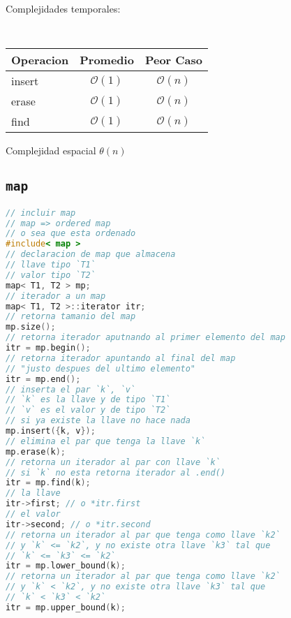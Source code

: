 \documentclass{article}
\newcommand{\bigO}{\mathcal{O}}
\begin{document}
\begin{multicols}{2}
Complejidades temporales:
\begin{table}[H]
  \tt \scriptsize
  \begin{center}
    \begin{tabular}[c]{l|c|c}
      \hline
      Operacion & Promedio & Peor Caso\\
      \hline
      insert & $\bigO(1)$ & $\bigO(n)$ \\
      \hline
      erase & $\bigO(1)$ & $\bigO(n)$\\
      \hline
      find & $\bigO(1)$ & $\bigO(n)$\\
      \hline
    \end{tabular}
  \end{center}
\end{table}

Complejidad espacial $\theta(n)$

\columnbreak
\subsection*{\tt\footnotesize map}
\begin{lstlisting}[language=C++]
// incluir map
// map => ordered map
// o sea que esta ordenado
#include< map >
// declaracion de map que almacena
// llave tipo `T1`
// valor tipo `T2`
map< T1, T2 > mp;
// iterador a un map
map< T1, T2 >::iterator itr;
// retorna tamanio del map
mp.size();
// retorna iterador aputnando al primer elemento del map
itr = mp.begin();
// retorna iterador apuntando al final del map
// "justo despues del ultimo elemento"
itr = mp.end();
// inserta el par `k`, `v`
// `k` es la llave y de tipo `T1`
// `v` es el valor y de tipo `T2`
// si ya existe la llave no hace nada
mp.insert({k, v});
// elimina el par que tenga la llave `k`
mp.erase(k);
// retorna un iterador al par con llave `k`
// si `k` no esta retorna iterador al .end()
itr = mp.find(k);
// la llave
itr->first; // o *itr.first
// el valor
itr->second; // o *itr.second
// retorna un iterador al par que tenga como llave `k2`
// y `k` <= `k2`, y no existe otra llave `k3` tal que
// `k` <= `k3` <= `k2`
itr = mp.lower_bound(k);
// retorna un iterador al par que tenga como llave `k2`
// y `k` < `k2`, y no existe otra llave `k3` tal que
// `k` < `k3` < `k2`
itr = mp.upper_bound(k);
\end{lstlisting}


\end{multicols}
\end{document}
